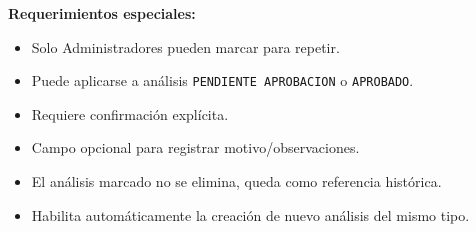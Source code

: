 \vspace{0.5em}
\noindent\textbf{Requerimientos especiales:}
\begin{itemize}[nosep]
    \item Solo Administradores pueden marcar para repetir.
    \item Puede aplicarse a análisis \texttt{PENDIENTE APROBACION} o \texttt{APROBADO}.
    \item Requiere confirmación explícita.
    \item Campo opcional para registrar motivo/observaciones.
    \item El análisis marcado no se elimina, queda como referencia histórica.
    \item Habilita automáticamente la creación de nuevo análisis del mismo tipo.
\end{itemize}

